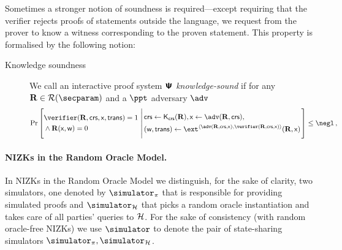 \let\accentvec\vec \documentclass[runningheads,10pt]{llncs}
\begin{document}
	Sometimes a stronger notion of soundness is required---except requiring that the verifier rejects proofs of statements outside the language, we request from the prover to know a witness corresponding to the proven statement. This property is formalised by the following notion:
\begin{description}
	\item[Knowledge soundness] We call an interactive proof system $\bm{\mathsf{\Psi}}$
			\emph{knowledge-sound} if for any $\REL \in \RELGEN(\secparam)$ and a $\ppt$ adversary $\adv$
	\[
	\Pr\left[
		\begin{aligned}
			& \verifier(\REL, \crs, \inp, \trans) = 1 \\
			& \land \REL(\inp, \wit) = 0
	 \end{aligned}
	  \,\left|\,
	 \begin{aligned}
		 & \crs \gets \kcrs(\REL), \inp \gets \adv(\REL, \crs), \\
		 & (\wit, \trans) \gets \ext^{\ip{\adv(\REL, \crs, \inp)}{\verifier(\REL, \crs, \inp)}}(\REL, \inp)
	 \end{aligned}
	 \vphantom{\begin{aligned}
		 \adv (\trans) = 1, \\
		 \text{if $\trans{}$ is accepting} \\
		 \pcind \text{then $\REL(\inp, \wit)$}
	 \end{aligned}}\right.
	 \right] \leq \negl\,,
 \]
\end{description}

\paragraph{NIZKs in the Random Oracle Model.}
In NIZKs in the Random Oracle Model we distinguish, for the sake of clarity, two simulators, one denoted by $\simulator_\zkproof$ that is responsible for providing simulated proofs and $\simulator_\ro$ that picks a random oracle instantiation and takes care of all parties' queries to $\mathcal{H}$.
For the sake of consistency (with random oracle-free NIZKs) we use $\simulator$
to denote the pair of state-sharing simulators $\simulator_\zkproof,
\simulator_\ro$.
\end{document}
